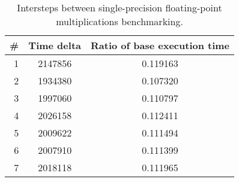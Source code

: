 \begin{table}
\centering
\begin{tabular}{rcc}
\# & Time delta & Ratio of base execution time\\
\hline
1 & 2147856 & 0.119163 \\
2 & 1934380 & 0.107320 \\
3 & 1997060 & 0.110797 \\
4 & 2026158 & 0.112411 \\
5 & 2009622 & 0.111494 \\
6 & 2007910 & 0.111399 \\
7 & 2018118 & 0.111965 \\
\end{tabular}
\captionsetup{justification=centering}
\caption{Intersteps between single-precision floating-point multiplications benchmarking.}
\end{table}
